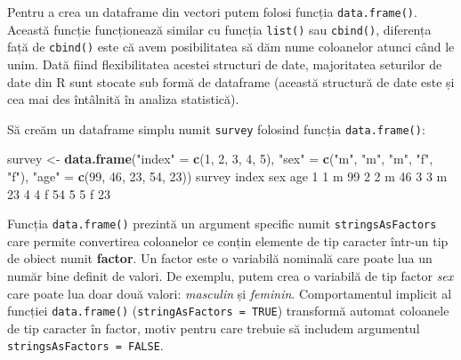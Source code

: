 \documentclass[]{article}
\newenvironment{Shaded}{\begin{snugshade}}{\end{snugshade}}
\newcommand{\KeywordTok}[1]{\textcolor[rgb]{0.13,0.29,0.53}{\textbf{#1}}}
\newcommand{\DecValTok}[1]{\textcolor[rgb]{0.00,0.00,0.81}{#1}}
\newcommand{\StringTok}[1]{\textcolor[rgb]{0.31,0.60,0.02}{#1}}
\newcommand{\NormalTok}[1]{#1}
\begin{document}
Pentru a crea un dataframe din vectori putem folosi funcția
\texttt{data.frame()}. Această funcție funcționează similar cu funcția
\texttt{list()} sau \texttt{cbind()}, diferența față de \texttt{cbind()}
este că avem posibilitatea să dăm nume coloanelor atunci când le unim.
Dată fiind flexibilitatea acestei structuri de date, majoritatea
seturilor de date din R sunt stocate sub formă de dataframe (această
structură de date este și cea mai des întâlnită în analiza statistică).

Să creăm un dataframe simplu numit \texttt{survey} folosind funcția
\texttt{data.frame()}:

\begin{Shaded}
\begin{Highlighting}[]
\NormalTok{survey <-}\StringTok{ }\KeywordTok{data.frame}\NormalTok{(}\StringTok{"index"}\NormalTok{ =}\StringTok{ }\KeywordTok{c}\NormalTok{(}\DecValTok{1}\NormalTok{, }\DecValTok{2}\NormalTok{, }\DecValTok{3}\NormalTok{, }\DecValTok{4}\NormalTok{, }\DecValTok{5}\NormalTok{),}
                     \StringTok{"sex"}\NormalTok{ =}\StringTok{ }\KeywordTok{c}\NormalTok{(}\StringTok{"m"}\NormalTok{, }\StringTok{"m"}\NormalTok{, }\StringTok{"m"}\NormalTok{, }\StringTok{"f"}\NormalTok{, }\StringTok{"f"}\NormalTok{),}
                     \StringTok{"age"}\NormalTok{ =}\StringTok{ }\KeywordTok{c}\NormalTok{(}\DecValTok{99}\NormalTok{, }\DecValTok{46}\NormalTok{, }\DecValTok{23}\NormalTok{, }\DecValTok{54}\NormalTok{, }\DecValTok{23}\NormalTok{))}
\NormalTok{survey}
\NormalTok{  index sex age}
\DecValTok{1}     \DecValTok{1}\NormalTok{   m  }\DecValTok{99}
\DecValTok{2}     \DecValTok{2}\NormalTok{   m  }\DecValTok{46}
\DecValTok{3}     \DecValTok{3}\NormalTok{   m  }\DecValTok{23}
\DecValTok{4}     \DecValTok{4}\NormalTok{   f  }\DecValTok{54}
\DecValTok{5}     \DecValTok{5}\NormalTok{   f  }\DecValTok{23}
\end{Highlighting}
\end{Shaded}

Funcția \texttt{data.frame()} prezintă un argument specific numit
\texttt{stringsAsFactors} care permite convertirea coloanelor ce conțin
elemente de tip caracter într-un tip de obiect numit \textbf{factor}. Un
factor este o variabilă nominală care poate lua un număr bine definit de
valori. De exemplu, putem crea o variabilă de tip factor \emph{sex} care
poate lua doar două valori: \emph{masculin} și \emph{feminin}.
Comportamentul implicit al funcției \texttt{data.frame()}
(\texttt{stringAsFactors\ =\ TRUE}) transformă automat coloanele de tip
caracter în factor, motiv pentru care trebuie să includem argumentul
\texttt{stringsAsFactors\ =\ FALSE}.
\end{document}
